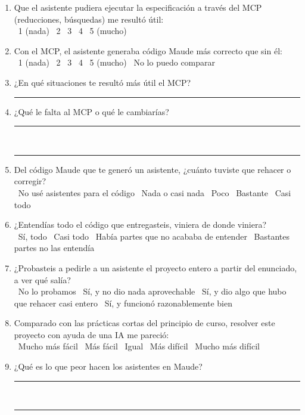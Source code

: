 \begin{enumerate}[leftmargin=*,resume]
\item Que el asistente pudiera ejecutar la especificaci\'on a trav\'es del MCP
(reducciones, b\'usquedas) me result\'o \'util:\\
\cb\ 1 (nada) \quad \cb\ 2 \quad \cb\ 3 \quad \cb\ 4 \quad \cb\ 5 (mucho)

\item Con el MCP, el asistente generaba c\'odigo Maude m\'as correcto que sin
\'el:\\
\cb\ 1 (nada) \quad \cb\ 2 \quad \cb\ 3 \quad \cb\ 4 \quad \cb\ 5 (mucho)
\quad \cb\ No lo puedo comparar

\item ¿En qu\'e situaciones te result\'o m\'as \'util el MCP?\\[8pt]
\rule{\linewidth}{0.4pt}

\item ¿Qu\'e le falta al MCP o qu\'e le cambiar\'ias?\\[8pt]
\rule{\linewidth}{0.4pt}\\[10pt]
\rule{\linewidth}{0.4pt}

\item\label{q:rehacer} Del c\'odigo Maude que te gener\'o un asistente, ¿cu\'anto tuviste que
rehacer o corregir?\\
\cb\ No us\'e asistentes para el c\'odigo \quad \cb\ Nada o casi nada \quad
\cb\ Poco \quad \cb\ Bastante \quad \cb\ Casi todo

\item ¿Entend\'ias todo el c\'odigo que entregasteis, viniera de donde
viniera?\\
\cb\ S\'i, todo \quad \cb\ Casi todo \quad \cb\ Hab\'ia partes que no acababa de entender \quad
\cb\ Bastantes partes no las entend\'ia

\item ¿Probasteis a pedirle a un asistente el proyecto entero a partir del
enunciado, a ver qu\'e sal\'ia?\\
\cb\ No lo probamos \quad
\cb\ S\'i, y no dio nada aprovechable \quad
\cb\ S\'i, y dio algo que hubo que rehacer casi entero \quad
\cb\ S\'i, y funcion\'o razonablemente bien

\item Comparado con las pr\'acticas cortas del principio de curso, resolver
este proyecto con ayuda de una IA me pareci\'o:\\
\cb\ Mucho m\'as f\'acil \quad \cb\ M\'as f\'acil \quad \cb\ Igual \quad
\cb\ M\'as dif\'icil \quad \cb\ Mucho m\'as dif\'icil

\item ¿Qu\'e es lo que peor hacen los asistentes en Maude?\\[8pt]
\rule{\linewidth}{0.4pt}\\[10pt]
\rule{\linewidth}{0.4pt}

\end{enumerate}


